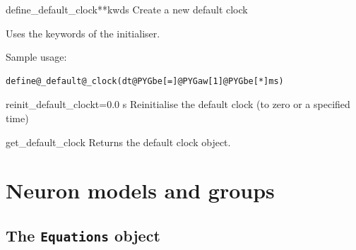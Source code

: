 \documentclass[letterpaper,10pt,english]{manual}
\begin{document}
\hypertarget{brian.define_default_clock}{}\begin{funcdesc}{define\_default\_clock}{**kwds}
Create a new default clock

Uses the keywords of the \hyperlink{brian.Clock}{} initialiser.

Sample usage:

\begin{Verbatim}[commandchars=@\[\]]
define@_default@_clock(dt@PYGbe[=]@PYGaw[1]@PYGbe[*]ms)
\end{Verbatim}
\end{funcdesc}

\hypertarget{brian.reinit_default_clock}{}\begin{funcdesc}{reinit\_default\_clock}{t=0.0 s}
Reinitialise the default clock (to zero or a specified time)
\end{funcdesc}

\hypertarget{brian.get_default_clock}{}\begin{funcdesc}{get\_default\_clock}{}
Returns the default clock object.
\end{funcdesc}

\resetcurrentobjects
{}

\hypertarget{index-84}{}\section{Neuron models and groups}

\hypertarget{index-85}{}\subsection{The \texttt{Equations} object}
\end{document}
